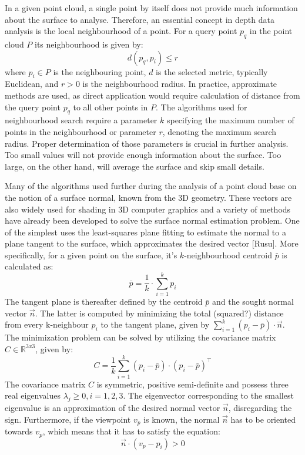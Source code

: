 
In a given point cloud, a single point by itself does not provide much information about the surface to analyse. Therefore, an essential concept in depth data analysis is the local neighbourhood of a point. For a query point $p_q$ in the point cloud $P$ its neighbourhood is given by:
\begin{equation}
d(p_	q, p_i) \leq r
\end{equation}
where $p_i \in P$ is the neighbouring point, $d$ is the selected metric, typically Euclidean, and $r>0$ is the neighbourhood radius. In practice, approximate methods are used, as direct application would require calculation of distance from the query point $p_q$ to all other points in $P$. The algorithms used for neighbourhood search require a parameter $k$ specifying the maximum number of points in the neighbourhood or parameter $r$, denoting the maximum search radius. Proper determination of those parameters is crucial in further analysis. Too small values will not provide enough information about the surface. Too large, on the other hand, will average the surface and skip small details.



Many of the algorithms used further during the analysis of a point cloud base on the notion of a surface normal, known from the 3D geometry. These vectors are also widely used for shading in 3D computer graphics and a variety of methods have already been developed to solve the surface normal estimation problem. One of the simplest uses the least-squares plane fitting to estimate the normal to a plane tangent to the surface, which approximates the desired vector [Rusu]. More specifically, for a given point on the surface, it's $k$-neighbourhood centroid $\bar{p}$ is calculated as:
\begin{equation} 
\bar{p} = \frac{1}{k} \cdot \sum\limits_{i=1}^{k} p_i 
\end{equation}
The tangent plane is thereafter defined by the centroid $\bar{p}$ and the sought normal vector $\vec{n}$. The latter is computed by minimizing the total (squared?) distance from every k-neighbour $p_i$ to the tangent plane, given by $\sum\limits_{i=1}^{k} (p_i - \bar{p})\cdot \vec{n}$. The minimization problem can be solved by utilizing the covariance matrix $C \in \mathbb{R}^{3x3}$, given by:
\begin{equation}
C = \frac{1}{k}\sum\limits_{i=1}^{k}(p_i - \bar{p})\cdot (p_i - \bar{p})^\intercal
\end{equation}
The covariance matrix $C$ is symmetric, positive semi-definite and possess three real eigenvalues $\lambda_j \geq 0, i = 1,2,3$. The eigenvector corresponding to the smallest eigenvalue is an approximation of the desired normal vector $\vec{n}$, disregarding the sign. Furthermore, if the viewpoint $v_p$ is known, the normal $\vec{n}$ has to be oriented towards  $v_p$, which means that it has to satisfy the equation:
\begin{equation}
\vec{n}\cdot(v_p-p_i) > 0
\end{equation}


